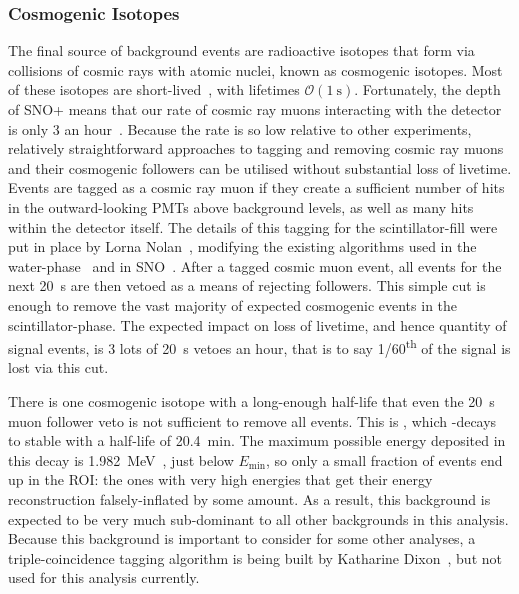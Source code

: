 \subsubsection{Cosmogenic Isotopes}
The final source of background events are radioactive isotopes that form via collisions of cosmic rays with atomic nuclei, known as cosmogenic isotopes. Most of these isotopes are short-lived~\cite{}, %
with lifetimes $\mathcal{O}(\SI{1}{\second})$. Fortunately, the depth of SNO+ means that our rate of cosmic ray muons interacting with the detector is only 3 an hour~\cite{}. %
Because the rate is so low relative to other experiments, relatively straightforward approaches to tagging and removing cosmic ray muons and their cosmogenic followers can be utilised without substantial loss of livetime. Events are tagged as a cosmic ray muon if they create a sufficient number of hits in the outward-looking PMTs above background levels, as well as many hits within the detector itself. The details of this tagging for the scintillator-fill were put in place by Lorna Nolan~\cite{}, %
modifying the existing algorithms used in the water-phase~\cite{} %
and in SNO~\cite{}. %
After a tagged cosmic muon event, all events for the next \SI{20}{\second} are then vetoed as a means of rejecting followers. This simple cut is enough to remove the vast majority of expected cosmogenic events in the scintillator-phase. %
The expected impact on loss of livetime, and hence quantity of signal events, is 3 lots of \SI{20}{\second} vetoes an hour, that is to say 1/60\textsuperscript{th} of the signal is lost via this cut.

There is one cosmogenic isotope with a long-enough half-life that even the \SI{20}{\second} muon follower veto is not sufficient to remove all events. This is , which \ce{\beta+}-decays to stable  with a half-life of \SI{20.4}{\minute}. The maximum possible energy deposited in this decay is \SI{1.982}{\MeV}~\cite{}, %
just below $E_{\textrm{min}}$, so only a small fraction of  events end up in the ROI: the ones with very high energies that get their energy reconstruction falsely-inflated by some amount. As a result, this background is expected to be very much sub-dominant to all other backgrounds in this analysis. Because this background is important to consider for some other analyses, a triple-coincidence tagging algorithm is being built by Katharine Dixon~\cite{}, %
but not used for this analysis currently.%

